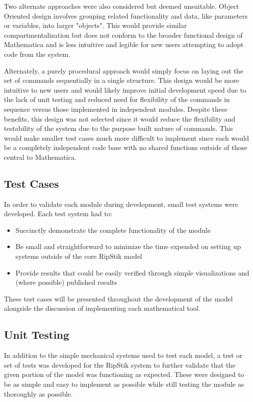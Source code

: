 Two alternate approaches were also considered but deemed unsuitable. Object Oriented design involves grouping related functionality and data, like parameters or variables, into larger "objects"\cite{ObjectOriented}.
This would provide similar compartmentalization \cite{ObjectOriented} but does not conform to the broader functional design of Mathematica \cite{MathematicaFunctional} and is less intuitive and legible for new users attempting to adopt code from the system. 

Alternately, a purely procedural approach would simply focus on laying out the set of commands sequentially in a single structure. 
This design would be more intuitive to new users and would likely improve initial development speed due to the lack of unit testing and reduced need for flexibility of the commands in sequence versus those implemented in independent modules.
Despite these benefits, this design was not selected since it would reduce the flexibility and testability of the system due to the purpose built nature of commands. 
This would make smaller test cases much more difficult to implement since each would be a completely independent code base with no shared functions outside of those central to Mathematica.
\subsection{Test Cases}
In order to validate each module during development, small test systems were developed. Each test system had to:
\begin{itemize}
\item Succinctly demonstrate the complete functionality of the module 
\item Be small and straightforward to minimize the time expended on setting up systems outside of the core RipStik model
\item Provide results that could be easily verified through simple visualizations and (where possible) published results
\end{itemize}
These test cases will be presented throughout the development of the model alongside the discussion of implementing each mathematical tool.
\subsection{Unit Testing}
In addition to the simple mechanical systems used to test each model, a test or set of tests was developed for the RipStik system to further validate that the given portion of the model was functioning as expected. These were designed to be as simple and easy to implement as possible while still testing the module as thoroughly as possible.
